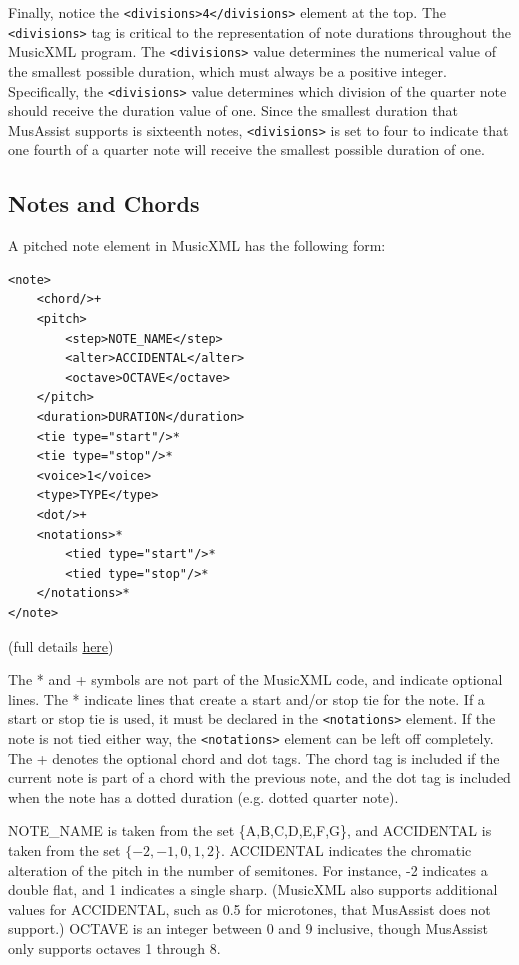 \documentclass{report}
\begin{document}
Finally, notice the \verb.<divisions>4</divisions>. element at the top. The \verb.<divisions>. tag is critical to the representation of note durations throughout the MusicXML program. The \verb.<divisions>. value determines the numerical value of the smallest possible duration, which must always be a positive integer. Specifically, the \verb.<divisions>. value determines which division of the quarter note should receive the duration value of one. Since the smallest duration that MusAssist supports is  sixteenth  notes, \verb.<divisions>. is set to four to indicate that one fourth of a quarter note will receive the smallest possible duration of one.

\subsection{Notes and Chords}
\label{sec:xmlnotes}
A pitched note element in MusicXML has the following form:

\begin{verbatim}
<note>
    <chord/>+
    <pitch>
        <step>NOTE_NAME</step>
        <alter>ACCIDENTAL</alter>
        <octave>OCTAVE</octave>
    </pitch>
    <duration>DURATION</duration>
    <tie type="start"/>*
    <tie type="stop"/>*
    <voice>1</voice>
    <type>TYPE</type>
    <dot/>+
    <notations>*
        <tied type="start"/>*
        <tied type="stop"/>*
    </notations>*
</note>
\end{verbatim}

\noindent (full details \href{https://www.w3.org/2021/06/musicxml40/musicxml-reference/elements/note/}{here})

The * and + symbols are not part of the MusicXML code, and indicate optional lines. The * indicate lines that create a start and/or stop tie for the note. If a start or stop tie is used, it must be declared in the \verb.<notations>. element. If the note is not tied either way, the \verb.<notations>. element can be left off completely. The + denotes the optional chord and dot tags. The chord tag is included if the current note is part of a chord with the previous note, and the dot tag is included when the note has a dotted duration (e.g. dotted quarter note).

NOTE\_NAME is taken from the set \{A,B,C,D,E,F,G\}, and ACCIDENTAL is taken from the set $\{-2,-1,0,1,2\}$. ACCIDENTAL indicates the chromatic alteration of the pitch in the number of semitones. For instance, -2 indicates a double flat, and 1 indicates a single sharp. (MusicXML also supports additional values for ACCIDENTAL, such as 0.5 for microtones, that MusAssist does not support.) OCTAVE is an integer between 0 and 9 inclusive, though MusAssist only supports octaves 1 through 8.
\end{document}
